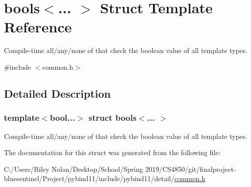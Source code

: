 \hypertarget{structbools}{}\section{bools$<$... $>$ Struct Template Reference}
\label{structbools}


Compile-\/time all/any/none of that check the boolean value of all template types.  




{\ttfamily \#include $<$common.\+h$>$}



\subsection{Detailed Description}
\subsubsection*{template$<$bool...$>$\newline
struct bools$<$... $>$}

Compile-\/time all/any/none of that check the boolean value of all template types. 

The documentation for this struct was generated from the following file\+:\begin{DoxyCompactItemize}
\item 
C\+:/\+Users/\+Riley Nolan/\+Desktop/\+School/\+Spring 2019/\+C\+S4850/git/finalproject-\/bluesentinel/\+Project/pybind11/include/pybind11/detail/\mbox{\hyperlink{detail_2common_8h}{common.\+h}}\end{DoxyCompactItemize}
